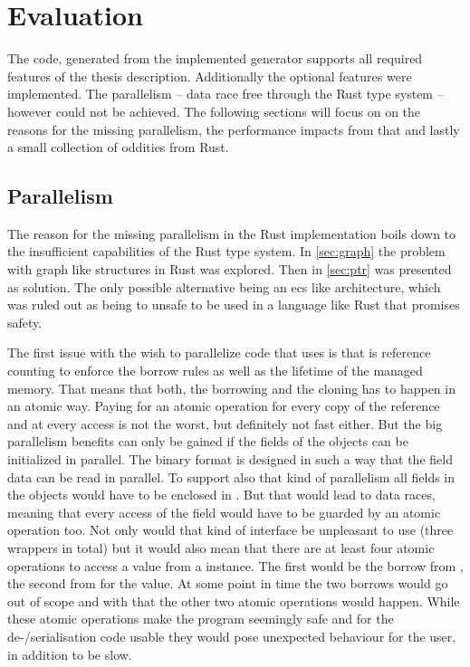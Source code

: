 \documentclass[thesis]{subfiles}
\begin{document}
\chapter{Evaluation}\label{chap:eval}
The code, generated from the implemented generator supports all required features of the thesis description.
Additionally the optional features were implemented.
The parallelism -- data race free through the Rust type system -- however could not be achieved.
The following sections will focus on on the reasons for the missing parallelism, the performance impacts from that and lastly a small collection of oddities from Rust.

\section{Parallelism}
  The reason for the missing parallelism in the Rust implementation boils down to the insufficient capabilities of the Rust type system.
  In \autoref{sec:graph} the problem with graph like structures in Rust was explored.
  Then in \autoref{sec:ptr} \PtrT was presented as solution.
  The only possible alternative being an \gls{ecs} like architecture, which was ruled out as being to unsafe to be used in a language like Rust that promises safety.

  The first issue with the wish to parallelize code that uses \PtrT is that \PtrT is reference counting to enforce the borrow rules as well as the lifetime of the managed memory.
  That means that both, the borrowing and the cloning has to happen in an atomic way.
  Paying for an atomic operation for every copy of the reference and at every access is not the worst, but definitely not fast either.
  But the big parallelism benefits can only be gained if the fields of the objects can be initialized in parallel.
  The binary format is designed in such a way that the field data can be read in parallel.
  To support also that kind of parallelism all fields in the objects would have to be enclosed in \RefCellT.
  But that would lead to data races, meaning that every access of the field would have to be guarded by an atomic operation too.
  Not only would that kind of interface be unpleasant to use (three wrappers in total) but it would also mean that there are at least four atomic operations to access a value from a \PtrT instance.
  The first would be the borrow from \PtrT, the second from \RefCellT for the value.
  At some point in time the two borrows would go out of scope and with that the other two atomic operations would happen.
  While these atomic operations make the program seemingly safe and for the de-/serialisation code usable they would pose unexpected behaviour for the user, in addition to be slow.
\end{document}
